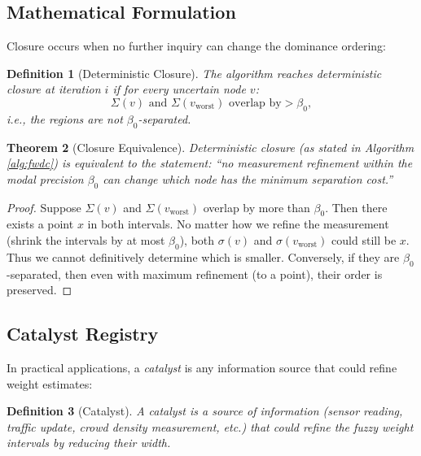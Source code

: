 \documentclass[twocolumn,11pt,a4paper]{article}
\newtheorem{theorem}{Theorem}[section]
\newtheorem{definition}[theorem]{Definition}
\theoremstyle{definition}
\begin{document}
\subsection{Mathematical Formulation}

Closure occurs when no further inquiry can change the dominance ordering:

\begin{definition}[Deterministic Closure]
\label{def:closure}
The algorithm reaches \emph{deterministic closure} at iteration $i$ if for every uncertain node $v$:
\begin{equation}
\Sigma(v) \text{ and } \Sigma(v_{\text{worst}}) \text{ overlap by} > \beta_0,
\end{equation}
i.e., the regions are not $\beta_0$-separated.
\end{definition}

\begin{theorem}[Closure Equivalence]
\label{thm:closure_equivalence}
Deterministic closure (as stated in Algorithm \ref{alg:fwdc}) is equivalent to the statement: ``no measurement refinement within the modal precision $\beta_0$ can change which node has the minimum separation cost.''
\end{theorem}

\begin{proof}
Suppose $\Sigma(v)$ and $\Sigma(v_{\text{worst}})$ overlap by more than $\beta_0$. Then there exists a point $x$ in both intervals. No matter how we refine the measurement (shrink the intervals by at most $\beta_0$), both $\sigma(v)$ and $\sigma(v_{\text{worst}})$ could still be $x$. Thus we cannot definitively determine which is smaller. Conversely, if they are $\beta_0$-separated, then even with maximum refinement (to a point), their order is preserved.
\end{proof}

\subsection{Catalyst Registry}

In practical applications, a \emph{catalyst} is any information source that could refine weight estimates:

\begin{definition}[Catalyst]
\label{def:catalyst}
A catalyst is a source of information (sensor reading, traffic update, crowd density measurement, etc.) that could refine the fuzzy weight intervals by reducing their width.
\end{definition}
\end{document}
